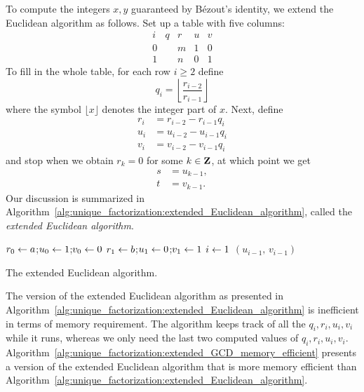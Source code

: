 To compute the integers $x,y$ guaranteed by B\'ezout's identity, we
extend the Euclidean algorithm as follows. Set up a table with five
columns:
\[
\begin{array}{rcccc}
  i  & q & r & u & v \\\hline
  0  &   & m & 1 & 0 \\
  1  &   & n & 0 & 1
\end{array}
\]
To fill in the whole table, for each row $i \geq 2$ define
\[
q_i
=
\left\lfloor
\frac {r_{i-2}} {r_{i-1}}
\right\rfloor
\]
where the symbol $\lfloor x \rfloor$ denotes the integer part of $x$.
Next, define
%
\begin{align*}
r_i &= r_{i-2} - r_{i-1} q_i \\
u_i &= u_{i-2} - u_{i-1} q_i \\
v_i &= v_{i-2} - v_{i-1} q_i
\end{align*}
%
and stop when we obtain $r_k = 0$ for some $k \in \mathbf{Z}$, at which point
we get
%
\begin{align*}
s &= u_{k-1}, \\
t &= v_{k-1}.
\end{align*}
%
Our discussion is summarized in
Algorithm~\ref{alg:unique_factorization:extended_Euclidean_algorithm},
called the
\emph{extended Euclidean algorithm}.

\begin{algorithm}[!htpb]
\dontprintsemicolon
\BlankLine
$r_0 \leftarrow a$;\quad $u_0 \leftarrow 1$;\quad $v_0 \leftarrow 0$\;
$r_1 \leftarrow b$;\quad $u_1 \leftarrow 0$;\quad $v_1 \leftarrow 1$\;
$i \leftarrow 1$\;
\Return $(u_{i-1},\, v_{i-1})$
\caption{The extended Euclidean algorithm.}
\label{alg:unique_factorization:extended_Euclidean_algorithm}
\end{algorithm}

The version of the extended Euclidean algorithm as presented in
Algorithm~\ref{alg:unique_factorization:extended_Euclidean_algorithm}
is inefficient in terms of memory requirement. The algorithm keeps
track of all the $q_i, r_i, u_i, v_i$ while it runs, whereas we only
need the last two computed values of $q_i, r_i, u_i, v_i$.
Algorithm~\ref{alg:unique_factorization:extended_GCD_memory_efficient}
presents a version of the extended Euclidean algorithm that is more
memory efficient than
Algorithm~\ref{alg:unique_factorization:extended_Euclidean_algorithm}.

